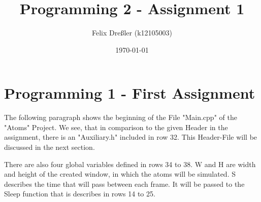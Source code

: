 \documentclass[11pt,titlepage]{article}
\title{Programming 2 - Assignment 1}
\author{Felix Dreßler (k12105003)}
\date{\today} %
\def\ContinueLineNumber{\lstset{firstnumber=last}}
\begin{document}
\maketitle
	\section{Programming 1 - First Assignment}	
	The following paragraph shows the beginning of the File "Main.cpp" of the "Atoms" Project. 
	We see, that in comparison to the given Header in the assignment, there is an "Auxiliary.h" included in row 32. This Header-File will be discussed in the next section.
	
	There are also four global variables defined in rows 34 to 38. W and H are width and height of the created window, in which the atoms will be simulated.
	S describes the time that will pass between each frame. It will be passed to the Sleep function that is describes in rows 14 to 25.
	
	
	\ContinueLineNumber
	
	
	\ContinueLineNumber
	
	
	\ContinueLineNumber
	
	
	\ContinueLineNumber
	
	
	\ContinueLineNumber
	
	
	\ContinueLineNumber
	
	
	\ContinueLineNumber
	
\end{document}
